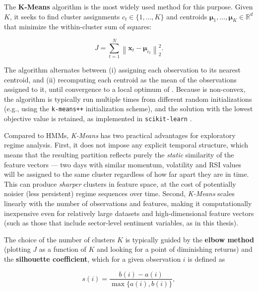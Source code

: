 The \textbf{K-Means} algorithm \cite{macqueen1967,lloyd1982} is the most
widely used method for this purpose. Given $K$, it seeks to find cluster
assignments $c_t \in \{1, \dots, K\}$ and centroids
$\boldsymbol{\mu}_1, \dots, \boldsymbol{\mu}_K \in \mathbb{R}^d$ that
minimize the within-cluster sum of squares:

\begin{equation}
  \label{eq:soa-kmeans-objective}
  J = \sum_{t=1}^{N} \left\lVert \mathbf{x}_t - \boldsymbol{\mu}_{c_t}
  \right\rVert_2^2 .
\end{equation}

The algorithm alternates between (i) assigning each observation to its
nearest centroid, and (ii) recomputing each centroid as the mean of the
observations assigned to it, until convergence to a local optimum of
. Because  is
non-convex, the algorithm is typically run multiple times from different
random initializations (e.g., using the \texttt{k-means++}
initialization scheme), and the solution with the lowest objective value
is retained, as implemented in \texttt{scikit-learn}
\cite{pedregosa2011sklearn}.

Compared to HMMs, \textit{K-Means} has two practical advantages for
exploratory regime analysis. First, it does not impose any explicit
temporal structure, which means that the resulting partition reflects
purely the \emph{static} similarity of the feature vectors --- two days
with similar momentum, volatility and RSI values will be assigned to the
same cluster regardless of how far apart they are in time. This can
produce \emph{sharper} clusters in feature space, at the cost of
potentially noisier (less persistent) regime sequences over time. Second,
\textit{K-Means} scales linearly with the number of observations and
features, making it computationally inexpensive even for relatively large
datasets and high-dimensional feature vectors (such as those that include
sector-level sentiment variables, as in this thesis).

The choice of the number of clusters $K$ is typically guided by the
\textbf{elbow method} (plotting $J$ as a function of $K$ and looking for a
point of diminishing returns) and the \textbf{silhouette coefficient},
which for a given observation $i$ is defined as

\begin{equation}
  \label{eq:soa-silhouette}
  s(i) = \frac{b(i) - a(i)}{\max\{a(i), b(i)\}},
\end{equation}

